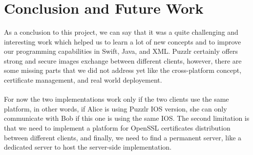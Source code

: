 \section{Conclusion and Future Work}
  \paragraph{}
   As a conclusion to this project, we can say that it was a quite challenging and interesting work which helped us to learn a lot of new concepts and to improve our programming capabilities in Swift, Java, and XML. Puzzlr certainly offers strong and secure images exchange between different clients, however, there are some missing parts that we did not address yet like the cross-platform concept, certificate management, and real world deployement.
   \paragraph{}
   For now the two implementations work only if the two clients use the same platform, in other words, if Alice is using Puzzlr IOS version, she can only communicate with Bob if this one is using the same IOS. The second limitation is that we need to implement a platform for OpenSSL certificates distribution between different clients, and finally, we need to find a permanent server, like a dedicated server to host the server-side implementation.